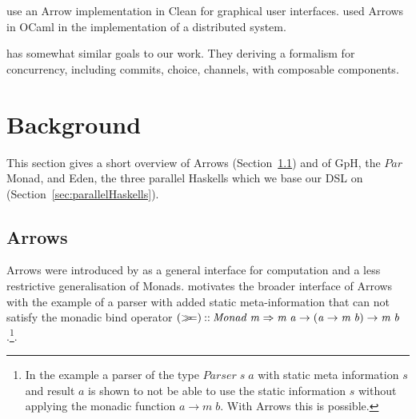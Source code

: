 \documentclass{jfp1}
\newcommand{\Conid}[1]{\mathit{#1}}
\newcommand{\Varid}[1]{\mathit{#1}}
\newcommand{\bind}{\mathbin{>\!\!\!>\mkern-6.7mu=}}
\begin{document}
\citet{achten2004arrows,achten2007arrow} use an Arrow implementation in Clean for graphical user interfaces. \citet{Dagand:2009:ORD:1481861.1481870} used Arrows in OCaml in the implementation of a distributed system.

\citet{turon_reagents:_2012} has somewhat similar goals to our work. They deriving a formalism for concurrency, including commits, choice, channels, with composable components.

        \section{Background}
	\label{sec:background}
	This section gives a short overview of Arrows
        (Section~\ref{sec:arrows}) and of GpH, the \ensuremath{\Conid{Par}} Monad, and
        Eden, the three parallel Haskells which we base our DSL on
        (Section~\ref{sec:parallelHaskells}).
	\subsection{Arrows}
\label{sec:arrows}
Arrows were introduced by \citet{HughesArrows} as a general interface for computation and a less restrictive generalisation of Monads. \citeauthor{HughesArrows} motivates the broader interface of Arrows with the example of a parser with added static meta-information that can not satisfy the monadic bind operator \ensuremath{(\bind )\mathbin{::}\Conid{Monad}\;\Varid{m}\Rightarrow \Varid{m}\;\Varid{a}\to (\Varid{a}\to \Varid{m}\;\Varid{b})\to \Varid{m}\;\Varid{b}}.\footnote{In the example a parser of the type \ensuremath{\Conid{Parser}\;\Varid{s}\;\Varid{a}} with static meta information \ensuremath{\Varid{s}} and result \ensuremath{\Varid{a}} is shown to not be able to use the static information \ensuremath{\Varid{s}} without applying the monadic function \ensuremath{\Varid{a}\to \Varid{m}\;\Varid{b}}. With Arrows this is possible.}.
\end{document}

